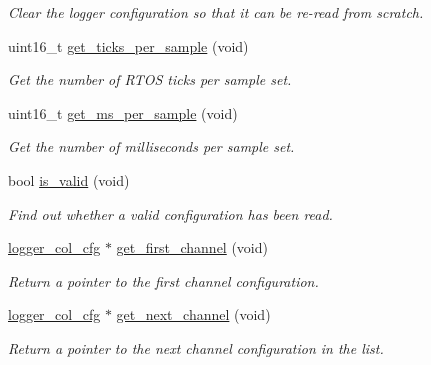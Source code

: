 \begin{DoxyCompactItemize}
\begin{DoxyCompactList}\small\item\em Clear the logger configuration so that it can be re-\/read from scratch. \end{DoxyCompactList}\item 
uint16\-\_\-t \hyperlink{classlogger__config_a00ecb0198a63a6821bc3b22ab71707dc}{get\-\_\-ticks\-\_\-per\-\_\-sample} (void)
\begin{DoxyCompactList}\small\item\em Get the number of R\-T\-O\-S ticks per sample set. \end{DoxyCompactList}\item 
uint16\-\_\-t \hyperlink{classlogger__config_ac23329790efe715df4951a7efae8c47a}{get\-\_\-ms\-\_\-per\-\_\-sample} (void)
\begin{DoxyCompactList}\small\item\em Get the number of milliseconds per sample set. \end{DoxyCompactList}\item 
bool \hyperlink{classlogger__config_ab5a799255ee75c91aedf52132ba538df}{is\-\_\-valid} (void)
\begin{DoxyCompactList}\small\item\em Find out whether a valid configuration has been read. \end{DoxyCompactList}\item 
\hypertarget{classlogger__config_a82b78e3c8e3d361555f94aeb0ee602f2}{\hyperlink{classlogger__col__cfg}{logger\-\_\-col\-\_\-cfg} $\ast$ \hyperlink{classlogger__config_a82b78e3c8e3d361555f94aeb0ee602f2}{get\-\_\-first\-\_\-channel} (void)}\label{classlogger__config_a82b78e3c8e3d361555f94aeb0ee602f2}

\begin{DoxyCompactList}\small\item\em Return a pointer to the first channel configuration. \end{DoxyCompactList}\item 
\hypertarget{classlogger__config_a1690a900cb93b0254085ef9eb76ddc45}{\hyperlink{classlogger__col__cfg}{logger\-\_\-col\-\_\-cfg} $\ast$ \hyperlink{classlogger__config_a1690a900cb93b0254085ef9eb76ddc45}{get\-\_\-next\-\_\-channel} (void)}\label{classlogger__config_a1690a900cb93b0254085ef9eb76ddc45}

\begin{DoxyCompactList}\small\item\em Return a pointer to the next channel configuration in the list. \end{DoxyCompactList}\end{DoxyCompactItemize}
